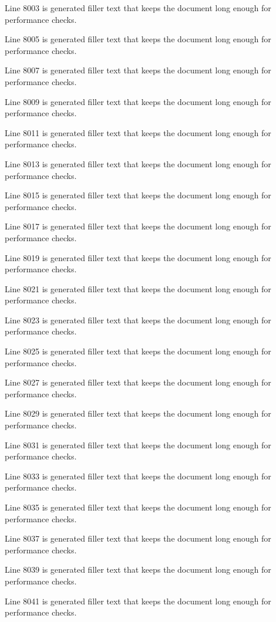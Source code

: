 Line 8003 is generated filler text that keeps the document long enough for performance checks.

Line 8005 is generated filler text that keeps the document long enough for performance checks.

Line 8007 is generated filler text that keeps the document long enough for performance checks.

Line 8009 is generated filler text that keeps the document long enough for performance checks.

Line 8011 is generated filler text that keeps the document long enough for performance checks.

Line 8013 is generated filler text that keeps the document long enough for performance checks.

Line 8015 is generated filler text that keeps the document long enough for performance checks.

Line 8017 is generated filler text that keeps the document long enough for performance checks.

Line 8019 is generated filler text that keeps the document long enough for performance checks.

Line 8021 is generated filler text that keeps the document long enough for performance checks.

Line 8023 is generated filler text that keeps the document long enough for performance checks.

Line 8025 is generated filler text that keeps the document long enough for performance checks.

Line 8027 is generated filler text that keeps the document long enough for performance checks.

Line 8029 is generated filler text that keeps the document long enough for performance checks.

Line 8031 is generated filler text that keeps the document long enough for performance checks.

Line 8033 is generated filler text that keeps the document long enough for performance checks.

Line 8035 is generated filler text that keeps the document long enough for performance checks.

Line 8037 is generated filler text that keeps the document long enough for performance checks.

Line 8039 is generated filler text that keeps the document long enough for performance checks.

Line 8041 is generated filler text that keeps the document long enough for performance checks.

